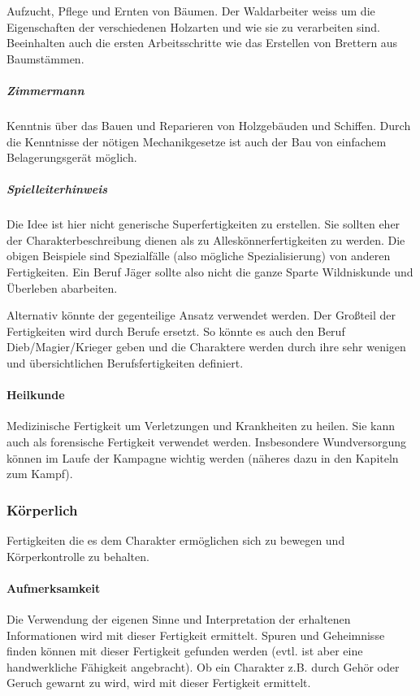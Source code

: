 \documentclass{article}
\begin{document}
Aufzucht, Pflege und Ernten von Bäumen. Der Waldarbeiter weiss um die Eigenschaften der verschiedenen Holzarten und
wie sie zu verarbeiten sind. Beeinhalten auch die ersten Arbeitsschritte wie das Erstellen von Brettern aus
Baumstämmen.

\subparagraph{Zimmermann}

Kenntnis über das Bauen und Reparieren von Holzgebäuden und Schiffen. Durch die Kenntnisse der nötigen
Mechanikgesetze ist auch der Bau von einfachem Belagerungsgerät möglich.

\begin{mdframed}[hidealllines=true, backgroundcolor=black!10]
\subparagraph{Spielleiterhinweis}

Die Idee ist hier nicht generische Superfertigkeiten zu erstellen. Sie sollten eher der Charakterbeschreibung dienen
als zu Alleskönnerfertigkeiten zu werden. Die obigen Beispiele sind Spezialfälle (also mögliche Spezialisierung) von
anderen Fertigkeiten. Ein Beruf Jäger sollte also nicht die ganze Sparte Wildniskunde und Überleben abarbeiten.

Alternativ könnte der gegenteilige Ansatz verwendet werden. Der Großteil der Fertigkeiten wird durch Berufe ersetzt.
So könnte es auch den Beruf Dieb/Magier/Krieger geben und die Charaktere werden durch ihre sehr wenigen und
übersichtlichen Berufsfertigkeiten definiert.

\end{mdframed}
\paragraph{Heilkunde}

Medizinische Fertigkeit um Verletzungen und Krankheiten zu heilen. Sie kann auch als forensische Fertigkeit
verwendet werden. Insbesondere Wundversorgung können im Laufe der Kampagne wichtig werden (näheres dazu in den
Kapiteln zum Kampf).

\subsubsection{Körperlich}

Fertigkeiten die es dem Charakter ermöglichen sich zu bewegen und Körperkontrolle zu behalten.

\paragraph{Aufmerksamkeit}

Die Verwendung der eigenen Sinne und Interpretation der erhaltenen Informationen wird mit dieser Fertigkeit
ermittelt. Spuren und Geheimnisse finden können mit dieser Fertigkeit gefunden werden (evtl. ist aber eine
handwerkliche Fähigkeit angebracht). Ob ein Charakter z.B. durch Gehör oder Geruch gewarnt zu wird, wird mit dieser
Fertigkeit ermittelt.
\end{document}
